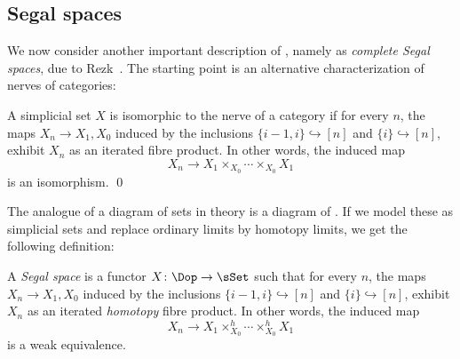 \documentclass[a4paper,12pt]{article}
\begin{document}
\subsection{Segal spaces}\label{subsec:segsp}
We now consider another important description of \icats{}, namely as
\emph{complete Segal spaces}, due to Rezk~\cite{RezkCSS}. The starting point is an alternative
characterization of nerves of categories:
\begin{propn}
  A simplicial set $X$ is isomorphic to the nerve of a category if
  for every $n$, the maps $X_{n} \to X_{1}, X_{0}$ induced by
  the inclusions $\{i-1,i\} \hookrightarrow [n]$ and
  $\{i\} \hookrightarrow [n]$, exhibit $X_{n}$ as an iterated fibre
  product.  In other words, the induced map
  \[ X_{n} \to X_{1} \times_{X_{0}} \cdots \times_{X_{0}} X_{1}\] is
  an isomorphism. \qed
\end{propn}
The analogue of a diagram of sets in \icat{} theory is a diagram of
\igpds{}. If we model these as simplicial sets and replace ordinary
limits by homotopy limits, we get the following definition:
\begin{defn}
  A \emph{Segal space} is a functor $X \colon \Dop \to \sSet$ such
  that for every $n$, the maps $X_{n} \to X_{1}, X_{0}$ induced by the
  inclusions $\{i-1,i\} \hookrightarrow [n]$ and
  $\{i\} \hookrightarrow [n]$, exhibit $X_{n}$ as an iterated
  \emph{homotopy} fibre
  product.  In other words, the induced map
  \[ X_{n} \to X_{1} \times^{h}_{X_{0}} \cdots \times^{h}_{X_{0}}
    X_{1}\] is a weak equivalence.
\end{defn}
\end{document}
